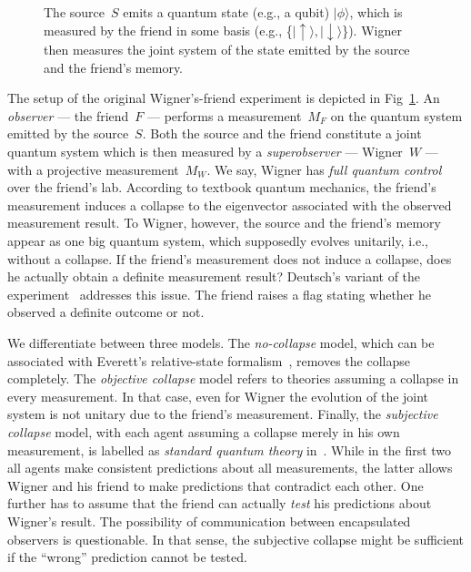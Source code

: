 \documentclass[aps,pra,12pt]{revtex4-2}
\newcommand{\ket}[1]{|#1 \rangle}
\newcommand{\da}{\downarrow}
\newcommand{\ua}{\uparrow}
\theoremstyle{definition}
\theoremstyle{remark}
\begin{document}
\begin{figure}
\centering
{}
\caption{The source~$S$ emits a quantum state (e.g., a qubit) $\ket{\phi}$, which is measured by the friend in some basis (e.g., \{$\ket{\ua}, \ket{\da}$\}). Wigner then measures the joint system of the state emitted by the source and the friend's memory.}
\label{fig:Wigner}
\end{figure}
The setup of the original Wigner's-friend experiment is depicted in Fig~\ref{fig:Wigner}.
An \emph{observer} --- the friend~$F$ --- performs a measurement~$M_F$ on the quantum system emitted by the source~$S$.
Both the source and the friend constitute a joint quantum system which is then measured by a \emph{superobserver} --- Wigner~$W$ --- with a projective measurement~$M_W$.
We say, Wigner has \emph{full quantum control} over the friend's lab.
According to textbook quantum mechanics, the friend's measurement induces a collapse to the eigenvector associated with the observed measurement result.
To Wigner, however, the source and the friend's memory appear as one big quantum system, which supposedly evolves unitarily, i.e., without a collapse.
If the friend's measurement does not induce a collapse, does he actually obtain a definite measurement result?
Deutsch's variant of the experiment~\cite{deutsch1985quantum} addresses this issue. 
The friend raises a flag stating whether he observed a definite outcome or not.

We differentiate between three models. 
The \emph{no-collapse} model, which can be associated with Everett's relative-state formalism~\cite{everett1957relative}, removes the collapse completely.
The \emph{objective collapse} model refers to theories assuming a collapse in every measurement. 
In that case, even for Wigner the evolution of the joint system is not unitary due to the friend's measurement.
Finally, the \emph{subjective collapse} model, with each agent assuming a collapse merely in his own measurement, is labelled as \emph{standard quantum theory} in~\cite{FrRen}.  
While in the first two all agents make consistent predictions about all measurements, the latter allows Wigner and his friend to make predictions that contradict each other.
One further has to assume that the friend can actually \emph{test} his predictions about Wigner's result.
The possibility of communication between encapsulated observers is questionable.
In that sense, the subjective collapse might be sufficient if the ``wrong'' prediction cannot be tested.
\end{document}
